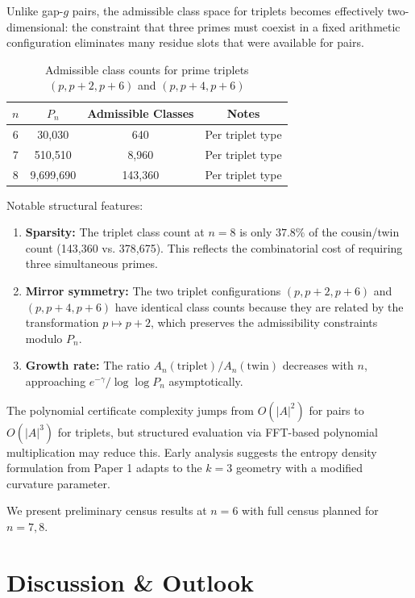 \documentclass[10pt,a4paper]{article}
\theoremstyle{remark}
\begin{document}
Unlike gap-$g$ pairs, the admissible class space for triplets becomes effectively
two-dimensional: the constraint that three primes must coexist in a fixed arithmetic
configuration eliminates many residue slots that were available for pairs.

\begin{table}[h]
\centering
\caption{Admissible class counts for prime triplets $(p, p+2, p+6)$ and $(p, p+4, p+6)$}
\begin{tabular}{cccc}
\toprule
$n$ & $P_n$ & Admissible Classes & Notes \\
\midrule
6 & 30,030 & 640 & Per triplet type \\
7 & 510,510 & 8,960 & Per triplet type \\
8 & 9,699,690 & 143,360 & Per triplet type \\
\bottomrule
\end{tabular}
\end{table}

Notable structural features:
\begin{enumerate}
\item \textbf{Sparsity:} The triplet class count at $n=8$ is only $37.8\%$ of the
cousin/twin count (143,360 vs. 378,675). This reflects the combinatorial cost of
requiring three simultaneous primes.
\item \textbf{Mirror symmetry:} The two triplet configurations $(p, p+2, p+6)$ and
$(p, p+4, p+6)$ have identical class counts because they are related by the
transformation $p \mapsto p+2$, which preserves the admissibility constraints
modulo $P_n$.
\item \textbf{Growth rate:} The ratio $A_n(\text{triplet})/A_n(\text{twin})$
decreases with $n$, approaching $e^{-\gamma}/\log\log P_n$ asymptotically.
\end{enumerate}

The polynomial certificate complexity jumps from $O(|A|^2)$ for pairs to
$O(|A|^3)$ for triplets, but structured evaluation via FFT-based polynomial
multiplication may reduce this. Early analysis suggests the entropy density
formulation from Paper 1 adapts to the $k=3$ geometry with a modified curvature
parameter.

We present preliminary census results at $n=6$ with full census planned for
$n=7, 8$.

\section{Discussion \& Outlook}
\end{document}
